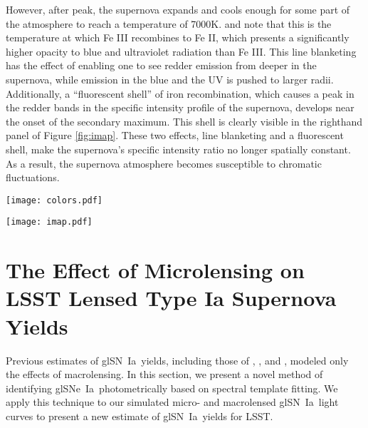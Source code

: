 \documentclass[iop,apj,numberedappendix,twocolappendix]{emulateapj}
\newcommand{\snia}{{\rm SN~Ia}}
\newcommand{\sneia}{{\rm SNe~Ia}}
\begin{document}
However, after peak, the supernova expands and cools enough for some part of the atmosphere to reach a temperature of 7000K.
\cite{2bump} and \cite{kw07} note that this is the temperature at which Fe III recombines to Fe II, which presents a significantly higher opacity to blue and ultraviolet radiation than Fe III.
This line blanketing has the effect of enabling one to see redder emission from deeper in the supernova, while emission in the blue and the UV is pushed to larger radii.
Additionally, a ``fluorescent shell'' of iron recombination, which causes a peak in the redder bands in the specific intensity profile of the supernova, develops near the onset of the secondary maximum.
This shell is clearly visible in the righthand panel of Figure \ref{fig:imap}.
These two effects, line blanketing and a fluorescent shell, make the supernova's specific intensity ratio no longer spatially constant.
As a result, the supernova atmosphere becomes susceptible to chromatic fluctuations.


\begin{figure*}
	\centering
    \texttt{[image: colors.pdf]}
    \caption{Rest-frame microlensed color curves of model W7.
    The intervals containing 68\%, 95\%, and 99\% of the 78,184 microlensed color curves described in Section \ref{sec:chrom} are plotted as progressively less opaque shaded regions.
    The color curves of the unlensed model are indistinguishable from the 68\% confidence regions of the microlensed models.   
    }
    \label{fig:ccs}
\end{figure*}

\begin{figure*}
	\centering
    \texttt{[image: imap.pdf]}
    \caption{Normalized projected specific intensity profiles of model W7.
    Near peak, the specific intensity profiles in $UBVRI$ are similar, so microlensing is achromatic.
    At day 40, UV line blanketing and the ``fluorescent shell'' (in which Fe III $\rightarrow$ Fe II recombination occurs) causes different bands have different specific intensity profiles.
    As a result, microlensing is chromatic at this stage.}
    \label{fig:imap}
\end{figure*}

\section{The Effect of Microlensing on LSST Lensed Type Ia Supernova Yields}
\label{sec:salt}

Previous estimates of gl\snia\ yields, including those of \cite{om10}, \cite{quimby14}, and \cite{gn17}, modeled only the effects of macrolensing.
In this section, we present a novel method of identifying gl\sneia\ photometrically based on spectral template fitting.
We apply this technique to our simulated micro- and macrolensed gl\snia\ light curves to present a new estimate of gl\snia\ yields for LSST.
\end{document}
